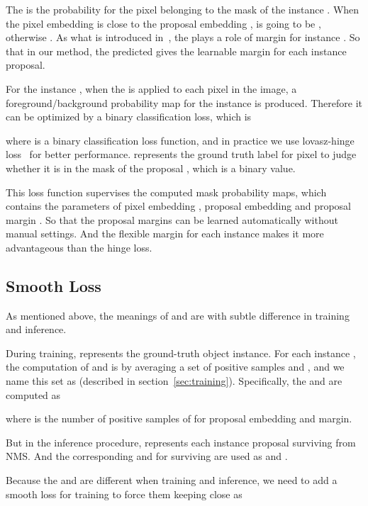 \documentclass[10pt,twocolumn,letterpaper]{article}
\begin{document}
The  is the probability for the pixel  belonging to the mask of the instance . When the pixel embedding  is close to the proposal embedding ,  is going to be , otherwise .
As what is introduced in~\cite{neven2019instance}, the  plays a role of margin for instance . 
So that in our method, the predicted  gives the learnable margin for each instance proposal. 

For the instance , when the  is applied to each pixel  in the image, a foreground/background probability map for the instance is produced. Therefore it can be optimized by a binary classification loss, which is 

where  is a binary classification loss function, and in practice we use lovasz-hinge loss~\cite{yu2015learning} for better performance. 
 represents the ground truth label for pixel  to judge whether it is in the mask of the proposal , which is a binary value. 


This loss function supervises the computed mask probability maps, which contains the parameters of pixel embedding , proposal embedding  and proposal margin . 
So that the proposal margins can be learned automatically without manual settings.
And the flexible margin for each instance makes it more advantageous than the hinge loss. 

\subsection{Smooth Loss}

As mentioned above, the meanings of  and  are with subtle difference in training and inference.

During training,  represents the ground-truth object instance. For each instance , the computation of  and  is by averaging a set of positive samples  and , and we name this set as  (described in section~\ref{sec:training}).
Specifically, the  and  are computed as 


where  is the number of positive samples of  for proposal embedding and margin. 

But in the inference procedure,  represents each instance proposal surviving from NMS. 
And the corresponding  and  for surviving  are used as  and .

Because the  and  are different when training and inference, 
we need to add a smooth loss for training to force them keeping close as
\end{document}
